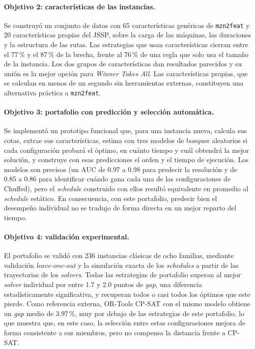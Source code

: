 \paragraph{Objetivo 2: características de las instancias.} Se construyó un
conjunto de datos con 65 características genéricas de \texttt{mzn2feat} y 20
características propias del JSSP, sobre la carga de las máquinas, las
duraciones y la estructura de las rutas. Las estrategias que usan
características cierran entre el 77\,\% y el 87\,\% de la brecha, frente al
76\,\% de una regla que solo usa el tamaño de la instancia. Los dos grupos de
características dan resultados parecidos y su unión es la mejor opción para
\textit{Winner Takes All}. Las características propias, que se calculan en
menos de un segundo sin herramientas externas, constituyen una alternativa
práctica a \texttt{mzn2feat}.

\paragraph{Objetivo 3: portafolio con predicción y selección automática.} Se
implementó un prototipo funcional que, para una instancia nueva, calcula sus
cotas, extrae sus características, estima con tres modelos de bosques
aleatorios si cada configuración probará el óptimo, en cuánto tiempo y cuál
obtendrá la mejor solución, y construye con esas predicciones el orden y el
tiempo de ejecución. Los modelos son precisos (un AUC de 0.97 a 0.98 para
predecir la resolución y de 0.85 a 0.86 para identificar cuándo gana cada
una de las configuraciones de Chuffed), pero el \textit{schedule} construido con ellos resultó
equivalente en promedio al \textit{schedule} estático. En consecuencia, con
este portafolio, predecir bien el desempeño individual no se tradujo de forma
directa en un mejor reparto del tiempo.

\paragraph{Objetivo 4: validación experimental.} El portafolio se validó con
236 instancias clásicas de ocho familias, mediante validación
\textit{leave-one-out} y la simulación exacta de los \textit{schedules} a
partir de las trayectorias de los \textit{solvers}. Todas las estrategias de
portafolio superan al mejor \textit{solver} individual por entre 1.7 y 2.0
puntos de \textit{gap}, una diferencia estadísticamente significativa, y
recuperan todos o casi todos los óptimos que este pierde.
Como referencia externa, OR-Tools CP-SAT con el mismo modelo
obtiene un \textit{gap} medio de 3.97\,\%, muy por debajo de las estrategias
de este portafolio, lo que muestra que, en este caso, la selección entre estas
configuraciones mejora de forma consistente a sus miembros, pero no compensa
la distancia frente a CP-SAT.

